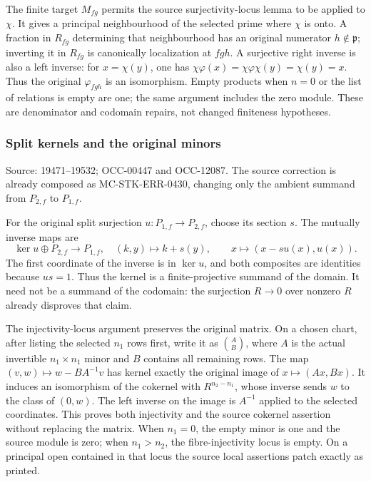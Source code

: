 The finite target \(M_{fg}\) permits the source surjectivity-locus lemma to be applied to \(\chi\). It gives a principal neighbourhood of the selected prime where \(\chi\) is onto. A fraction in \(R_{fg}\) determining that neighbourhood has an original numerator \(h\notin\mathfrak p\); inverting it in \(R_{fg}\) is canonically localization at \(fgh\). A surjective right inverse is also a left inverse: for \(x=\chi(y)\), one has \(\chi\varphi(x)=\chi\varphi\chi(y)=\chi(y)=x\). Thus the original \(\varphi_{fgh}\) is an isomorphism. Empty products when \(n=0\) or the list of relations is empty are one; the same argument includes the zero module. These are denominator and codomain repairs, not changed finiteness hypotheses.

\subsubsection{Split kernels and the original minors}\label{algebra-proof-010-split-kernels-and-the-original-minors}

Source: 19471--19532; OCC-00447 and OCC-12087. The source correction is already composed as MC-STK-ERR-0430, changing only the ambient summand from \(P_{2,f}\) to \(P_{1,f}\).

For the original split surjection \(u:P_{1,f}\to P_{2,f}\), choose its section \(s\). The mutually inverse maps are \[
\ker u\oplus P_{2,f}\longrightarrow P_{1,f},\quad(k,y)\mapsto k+s(y),
\qquad
x\longmapsto(x-su(x),u(x)).
\] The first coordinate of the inverse is in \(\ker u\), and both composites are identities because \(us=1\). Thus the kernel is a finite-projective summand of the domain. It need not be a summand of the codomain: the surjection \(R\to0\) over nonzero \(R\) already disproves that claim.

The injectivity-locus argument preserves the original matrix. On a chosen chart, after listing the selected \(n_1\) rows first, write it as \(\binom A B\), where \(A\) is the actual invertible \(n_1\times n_1\) minor and \(B\) contains all remaining rows. The map \((v,w)\mapsto w-BA^{-1}v\) has kernel exactly the original image of \(x\mapsto(Ax,Bx)\). It induces an isomorphism of the cokernel with \(R^{n_2-n_1}\), whose inverse sends \(w\) to the class of \((0,w)\). The left inverse on the image is \(A^{-1}\) applied to the selected coordinates. This proves both injectivity and the source cokernel assertion without replacing the matrix. When \(n_1=0\), the empty minor is one and the source module is zero; when \(n_1>n_2\), the fibre-injectivity locus is empty. On a principal open contained in that locus the source local assertions patch exactly as printed.

